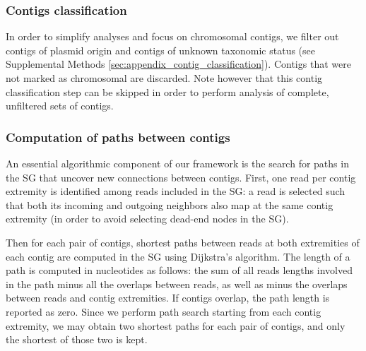 \documentclass[./main.tex]{subfiles}
\newcommand{\modafterreview}[1]{#1}
\begin{document}
\subsubsection{Contigs classification \label{sub:classif}}

\modafterreview{
In order to simplify analyses and focus on chromosomal contigs, we filter out contigs of plasmid origin and contigs of unknown taxonomic status (see Supplemental Methods \ref{sec:appendix_contig_classification}). Contigs that were not marked as chromosomal are discarded. Note however that this contig classification step can be skipped in order to perform analysis of complete, unfiltered sets of contigs.}

\subsubsection{Computation of paths between contigs\label{sec:path_analysis}}

\modafterreview{An essential algorithmic component of our framework is the search for paths in the SG that uncover new connections between contigs.}
First, one read per contig extremity is identified \modafterreview{among reads included in the SG: a read is selected such that both its incoming and outgoing neighbors also map at the same contig extremity (in order to avoid selecting dead-end nodes in the SG).}  %

Then for each pair of contigs, shortest paths between reads at both extremities of each contig are computed in the SG \modafterreview{using Dijkstra's algorithm}.
\modafterreview{The length of a path is computed in nucleotides as follows: the sum of all reads lengths involved in the path minus all the overlaps between reads, as well as minus the overlaps between reads and contig extremities.}
\modafterreview{If contigs overlap, the path length is reported as zero.}
\modafterreview{Since we perform path search starting from each contig extremity}, we may obtain two shortest paths for each pair of contigs, and only the shortest of those two is kept. 
 
\end{document}
